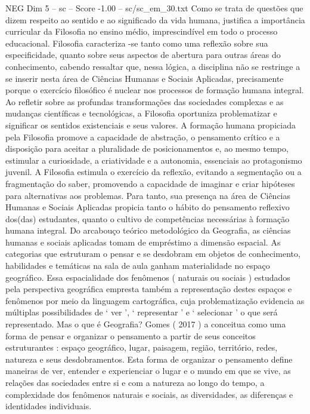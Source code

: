 \begin{textsample}{NEG Dim 5 – sc – Score -1.00 – sc/sc\_em\_30.txt}
Como se trata de questões que dizem respeito ao sentido e ao significado da vida humana, justifica a importância curricular da Filosofia no ensino médio, imprescindível em todo o processo educacional.
Filosofia caracteriza -se tanto como uma reflexão sobre sua especificidade, quanto sobre seus aspectos de abertura para outras áreas do conhecimento, cabendo ressaltar que, nessa lógica, a disciplina não se restringe a se inserir nesta área de Ciências Humanas e Sociais Aplicadas, precisamente porque o exercício filosófico é nuclear nos processos de formação humana integral.
Ao refletir sobre as profundas transformações das sociedades complexas e as mudanças científicas e tecnológicas, a Filosofia oportuniza problematizar e significar os sentidos existenciais e seus valores.
A formação humana propiciada pela Filosofia promove a capacidade de abstração, o pensamento crítico e a disposição para aceitar a pluralidade de posicionamentos e, ao mesmo tempo, estimular a curiosidade, a criatividade e a autonomia, essenciais ao protagonismo juvenil.
A Filosofia estimula o exercício da reflexão, evitando a segmentação ou a fragmentação do saber, promovendo a capacidade de imaginar e criar hipóteses para alternativas aos problemas.
Para tanto, sua presença na área de Ciências Humanas e Sociais Aplicadas propicia tanto o hábito do pensamento reflexivo dos(das) estudantes, quanto o cultivo de competências necessárias à formação humana integral.
Do arcabouço teórico metodológico da Geografia, as ciências humanas e sociais aplicadas tomam de empréstimo a dimensão espacial.
As categorias que estruturam o pensar e se desdobram em objetos de conhecimento, habilidades e temáticas na sala de aula ganham materialidade no espaço geográfico.
Essa espacialidade dos fenômenos ( naturais ou sociais ) estudados pela perspectiva geográfica empresta também a representação destes espaços e fenômenos por meio da linguagem cartográfica, cuja problematização evidencia as múltiplas possibilidades de ‘ ver ’, ‘ representar ’ e ‘ selecionar ’ o que será representado.
Mas o que é Geografia?
Gomes ( 2017 ) a conceitua como uma forma de pensar e organizar o pensamento a partir de seus conceitos estruturantes : espaço geográfico, lugar, paisagem, região, território, redes, natureza e seus desdobramentos.
Esta forma de organizar o pensamento define maneiras de ver, entender e experienciar o lugar e o mundo em que se vive, as relações das sociedades entre si e com a natureza ao longo do tempo, a complexidade dos fenômenos naturais e sociais, as diversidades, as diferenças e identidades individuais.

\end{textsample}
